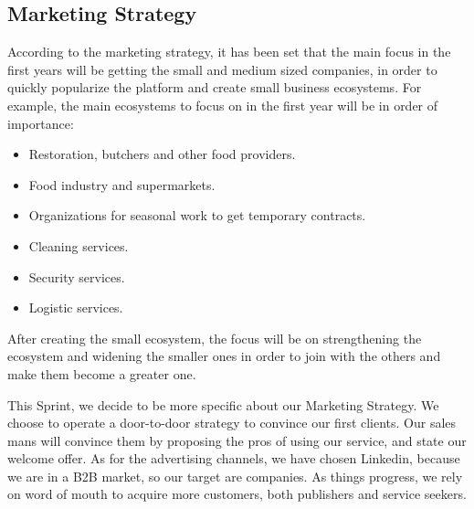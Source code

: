 \documentclass[./main.tex]{subfiles}
\begin{document}
\subsection{Marketing Strategy}
According to the marketing strategy, it has been set that the main focus in the first years will be getting the small and medium sized companies, in order to quickly popularize the platform and create small business ecosystems. For example, the main ecosystems to focus on in the first year will be in order of importance:
\begin{itemize}
	\item Restoration, butchers and other food providers.
	\item Food industry and supermarkets.
	\item Organizations for seasonal work to get temporary contracts.
	\item Cleaning services.
	\item Security services.
	\item Logistic services.
\end{itemize}
After creating the small ecosystem, the focus will be on strengthening the ecosystem and widening the smaller ones in order to join with the others and make them become a greater one.

This Sprint, we decide to be more specific about our Marketing Strategy. 
We choose to operate a door-to-door strategy to convince our first clients. Our sales mans will convince them by proposing the pros of using our service, and state our welcome offer.
As for the advertising channels, we have chosen Linkedin, because we are in a B2B market, so our target are companies. 
As things progress, we rely on word of mouth to acquire more customers, both publishers and service seekers.
\end{document}
